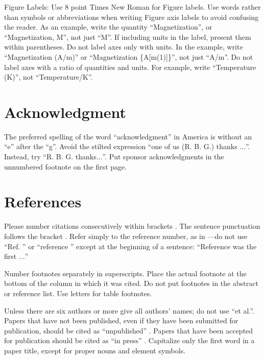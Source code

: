 \documentclass[conference]{IEEEtran}
\begin{document}

Figure Labels: Use 8 point Times New Roman for Figure labels. Use words 
rather than symbols or abbreviations when writing Figure axis labels to 
avoid confusing the reader. As an example, write the quantity 
``Magnetization'', or ``Magnetization, M'', not just ``M''. If including 
units in the label, present them within parentheses. Do not label axes only 
with units. In the example, write ``Magnetization (A/m)'' or ``Magnetization 
\{A[m(1)]\}'', not just ``A/m''. Do not label axes with a ratio of 
quantities and units. For example, write ``Temperature (K)'', not 
``Temperature/K''.

\section*{Acknowledgment}

The preferred spelling of the word ``acknowledgment'' in America is without 
an ``e'' after the ``g''. Avoid the stilted expression ``one of us (R. B. 
G.) thanks $\ldots$''. Instead, try ``R. B. G. thanks$\ldots$''. Put sponsor 
acknowledgments in the unnumbered footnote on the first page.

\section*{References}

Please number citations consecutively within brackets \cite{b1}. The 
sentence punctuation follows the bracket \cite{b2}. Refer simply to the reference 
number, as in \cite{b3}---do not use ``Ref. \cite{b3}'' or ``reference \cite{b3}'' except at 
the beginning of a sentence: ``Reference \cite{b3} was the first $\ldots$''

Number footnotes separately in superscripts. Place the actual footnote at 
the bottom of the column in which it was cited. Do not put footnotes in the 
abstract or reference list. Use letters for table footnotes.

Unless there are six authors or more give all authors' names; do not use 
``et al.''. Papers that have not been published, even if they have been 
submitted for publication, should be cited as ``unpublished'' \cite{b4}. Papers 
that have been accepted for publication should be cited as ``in press'' \cite{b5}. 
Capitalize only the first word in a paper title, except for proper nouns and 
element symbols.
\end{document}
